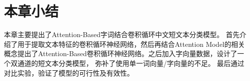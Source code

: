 \section{本章小结}
本章主要提出了Attention-Based字词结合卷积循环中文短文本分类模型。
首先介绍了用于提取文本特征的卷积循环神经网络，然后再结合Attention Model的相关
概念提出了Attention-Based卷积循环神经网络。之后加入字向量数据，设计了一个双通道的短文本分类模型，
弥补了使用单一词向量/字向量的不足。
最后通过对比实验，验证了模型的可行性及有效性。